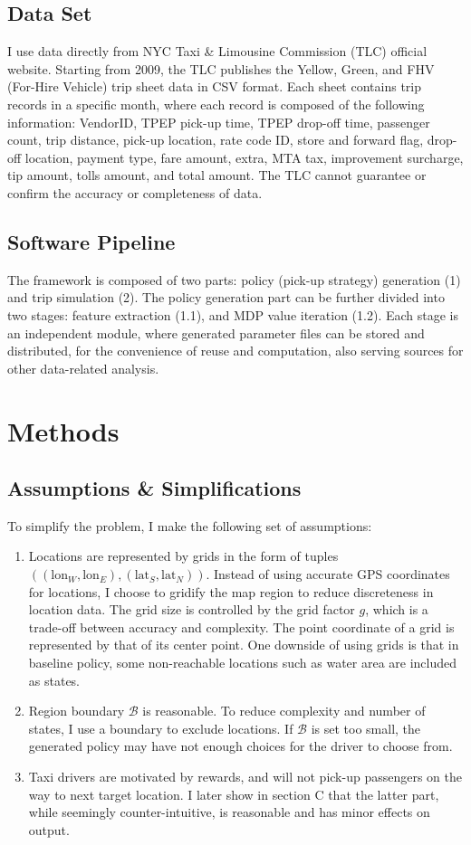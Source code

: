 \documentclass[letterpaper, 10 pt, conference]{ieeeconf}
\begin{document}
\subsection{Data Set}
I use data directly from NYC Taxi \& Limousine Commission (TLC) official website\cite{tlc}. Starting from 2009, the TLC publishes the Yellow, Green, and FHV (For-Hire Vehicle) trip sheet data in CSV format. Each sheet contains trip records in a specific month, where each record is composed of the following information: VendorID, TPEP pick-up time, TPEP drop-off time, passenger count, trip distance, pick-up location, rate code ID, store and forward flag, drop-off location, payment type, fare amount, extra, MTA tax, improvement surcharge, tip amount, tolls amount, and total amount\cite{rec}. The TLC cannot guarantee or confirm the accuracy or completeness of data. 
\subsection{Software Pipeline}
The framework is composed of two parts: policy (pick-up strategy) generation (1) and trip simulation (2). The policy generation part can be further divided into two stages: feature extraction (1.1), and MDP value iteration (1.2). Each stage is an independent module, where generated parameter files can be stored and distributed, for the convenience of reuse and computation, also serving sources for other data-related analysis. 
\section{Methods}
\subsection{Assumptions \& Simplifications}
To simplify the problem, I make the following set of assumptions:
\begin{enumerate}
\item Locations are represented by grids in the form of tuples $((\text{lon}_W, \text{lon}_E), (\text{lat}_S, \text{lat}_N))$. Instead of using accurate GPS coordinates for locations, I choose to gridify the map region to reduce discreteness in location data. The grid size is controlled by the grid factor $g$, which is a trade-off between accuracy and complexity. The point coordinate of a grid is represented by that of its center point. One downside of using grids is that in baseline policy, some non-reachable locations such as water area are included as states.
\item Region boundary $\mathcal{B}$ is reasonable. To reduce complexity and number of states, I use a boundary to exclude locations. If $\mathcal{B}$ is set too small, the generated policy may have not enough choices for the driver to choose from.
\item Taxi drivers are motivated by rewards, and will not pick-up passengers on the way to next target location. I later show in section C that the latter part, while seemingly counter-intuitive, is reasonable and has minor effects on output.
\end{enumerate}
\end{document}
